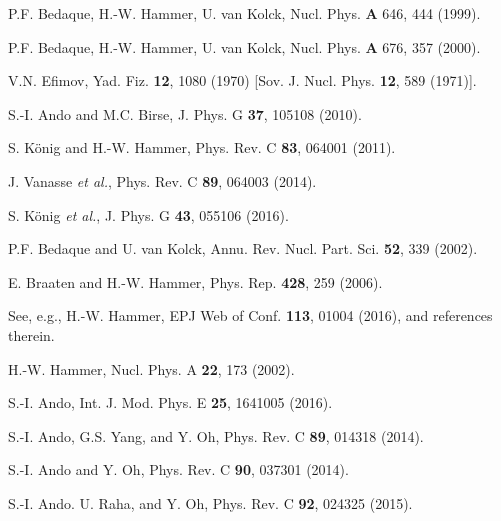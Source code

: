 \documentclass[jkps,preprint,fleqn,showpacs,showkeys]{revtex4}
\begin{document}
\begin{references}
P.F. Bedaque, H.-W. Hammer, U. van Kolck,
Nucl. Phys. {\bf A} 646, 444 (1999).

P.F. Bedaque, H.-W. Hammer, U. van Kolck,
Nucl. Phys. {\bf A} 676, 357 (2000).

V.N. Efimov,
Yad. Fiz. {\bf 12}, 1080 (1970)
[Sov. J. Nucl. Phys. {\bf 12}, 589 (1971)].

S.-I. Ando and M.C. Birse,
J. Phys. G {\bf 37}, 105108 (2010).

S. K\"onig and H.-W. Hammer,
Phys. Rev. C {\bf 83}, 064001 (2011).

J. Vanasse {\it et al.},
Phys. Rev. C {\bf 89}, 064003 (2014).

S. K\"onig {\it et al.},
J. Phys. G {\bf 43}, 055106 (2016).

P.F. Bedaque and U. van Kolck,
Annu. Rev. Nucl. Part. Sci. {\bf 52}, 339 (2002).

E. Braaten and H.-W. Hammer,
Phys. Rep. {\bf 428}, 259 (2006).

See, e.g., H.-W. Hammer,
EPJ Web of Conf. {\bf 113}, 01004 (2016),
and references therein.

H.-W. Hammer,
Nucl. Phys. A {\bf 22}, 173 (2002).

S.-I. Ando,
Int. J. Mod. Phys. E {\bf 25}, 1641005  (2016).

S.-I. Ando, G.S. Yang, and Y. Oh,
Phys. Rev. C {\bf 89}, 014318 (2014).

S.-I. Ando and Y. Oh,
Phys. Rev. C {\bf 90}, 037301 (2014).

S.-I. Ando. U. Raha, and Y. Oh,
Phys. Rev. C {\bf 92}, 024325 (2015).


\end{references}
\end{document}
